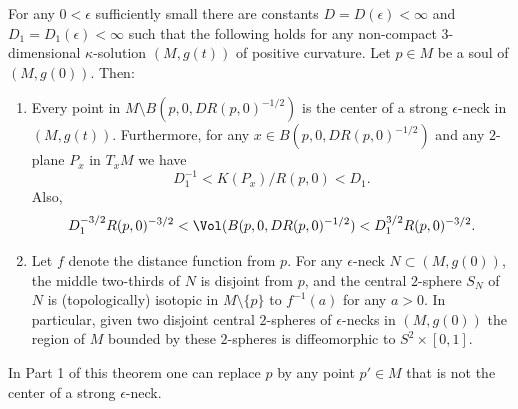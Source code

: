 \begin{proposition}\label{prop:uniform-neck-structure-constants}
\label{uniformD}
For any $0<\epsilon$ sufficiently small there are constants
 $D=D(\epsilon)<\infty$ and $D_1=D_1(\epsilon)<\infty$
 such that the following holds for  any non-compact $3$-dimensional
 $\kappa$-solution $(M,g(t))$ of positive
curvature. Let $p\in M$ be a soul of $(M,g(0))$. Then:
\begin{enumerate}
\item[(1)] Every point in $M\setminus B(p,0,DR(p,0)^{-1/2})$ is the center
of a strong $\epsilon$-neck in $(M,g(t))$. Furthermore, for any
$x\in B(p,0,DR(p,0)^{-1/2})$ and any $2$-plane $P_x$ in $T_xM$ we
have
$$D_1^{-1}<K(P_x)/R(p,0)<D_1.$$
Also,
$$D_1^{-3/2}R(p,0)^{-3/2}< \Vol(B(p,0,DR(p,0)^{-1/2})<D_1^{3/2}R(p,0)^{-3/2}.$$
 \item[(2)] Let $f$
denote the distance function from $p$. For any $\epsilon$-neck
$N\subset (M,g(0))$, the middle two-thirds of $N$ is disjoint from
$p$, and the central $2$-sphere $S_N$ of $N$ is (topologically)
isotopic in $M\setminus \{p\}$ to $f^{-1}(a)$ for any $a>0$. In
particular, given two disjoint central $2$-spheres of
 $\epsilon$-necks in $(M,g(0))$ the region of $M$ bounded by these $2$-spheres is
 diffeomorphic
 to $S^2\times [0,1]$.
 \end{enumerate}
\end{proposition}

\begin{remark}\label{rem:uniform-neck-structure-basepoint-remark}
In Part 1 of this theorem one can  replace $p$ by any point $p'\in
M$ that is not the center of a strong $\epsilon$-neck.
\end{remark}



